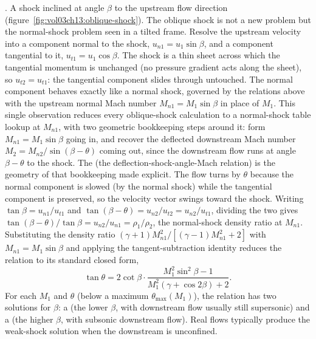

. A shock inclined at angle $\beta$ to the
upstream flow direction (figure~\ref{fig:vol03ch13:oblique-shock}).
The oblique shock is not a new problem but the normal-shock problem
seen in a tilted frame. Resolve the upstream velocity into a
component normal to the shock, $u_{n1} = u_1 \sin\beta$, and a
component tangential to it, $u_{t1} = u_1 \cos\beta$. The shock is a
thin sheet across which the tangential momentum is unchanged (no
pressure gradient acts along the sheet), so $u_{t2} = u_{t1}$: the
tangential component slides through untouched. The normal component
behaves exactly like a normal shock, governed by the relations above
with the upstream normal Mach number $M_{n1} = M_1 \sin\beta$ in
place of $M_1$. This single observation reduces every oblique-shock
calculation to a normal-shock table lookup at $M_{n1}$, with two
geometric bookkeeping steps around it: form $M_{n1} = M_1\sin\beta$
going in, and recover the deflected downstream Mach number $M_2 =
M_{n2}/\sin(\beta - \theta)$ coming out, since the downstream flow
runs at angle $\beta - \theta$ to the shock. The  (the deflection-shock-angle-Mach relation) is
the geometry of that bookkeeping made explicit. The flow turns by
$\theta$ because the normal component is slowed (by the normal shock)
while the tangential component is preserved, so the velocity vector
swings toward the shock. Writing $\tan\beta = u_{n1}/u_{t1}$ and
$\tan(\beta - \theta) = u_{n2}/u_{t2} = u_{n2}/u_{t1}$, dividing the
two gives $\tan(\beta - \theta)/\tan\beta = u_{n2}/u_{n1} =
\rho_1/\rho_2$, the normal-shock density ratio at $M_{n1}$.
Substituting the density ratio $(\gamma + 1)M_{n1}^2/[(\gamma -
1)M_{n1}^2 + 2]$ with $M_{n1} = M_1\sin\beta$ and applying the
tangent-subtraction identity reduces the relation to its standard
closed form,
\[
\tan\theta = 2\cot\beta\cdot\frac{M_1^2 \sin^2\beta - 1}{M_1^2(\gamma
+ \cos 2\beta) + 2}.
\]
For each $M_1$ and $\theta$ (below a maximum $\theta_{\max}(M_1)$),
the relation has two solutions for $\beta$: a  (the lower $\beta$, with downstream flow usually still
supersonic) and a  (the higher $\beta$,
with subsonic downstream flow). Real flows typically produce the
weak-shock solution when the downstream is unconfined.




